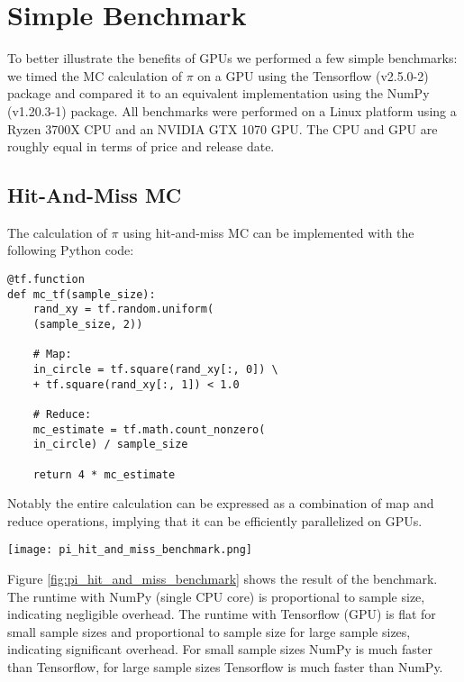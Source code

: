 \section{Simple Benchmark}
To better illustrate the benefits of GPUs we performed a few simple benchmarks:
we timed the MC calculation of $\pi$ on a GPU using the Tensorflow (v2.5.0-2) package and compared it
to an equivalent implementation using the NumPy (v1.20.3-1) package.
All benchmarks were performed on a Linux platform using a Ryzen 3700X CPU and an NVIDIA GTX 1070 GPU.
The CPU and GPU are roughly equal in terms of price and release date.
\subsection{Hit-And-Miss MC}
The calculation of $\pi$ using hit-and-miss MC can be implemented with the following Python code:
\begin{lstlisting}
@tf.function
def mc_tf(sample_size):
    rand_xy = tf.random.uniform(
	(sample_size, 2))

    # Map:
    in_circle = tf.square(rand_xy[:, 0]) \
	+ tf.square(rand_xy[:, 1]) < 1.0

    # Reduce:
    mc_estimate = tf.math.count_nonzero(
	in_circle) / sample_size

    return 4 * mc_estimate
\end{lstlisting}
Notably the entire calculation can be expressed as a combination of map and reduce operations,
implying that it can be efficiently parallelized on GPUs.
\begin{figure*}
	\centering
	\texttt{[image: pi\_hit\_and\_miss\_benchmark.png]}
	\caption{
		Benchmark of hit-and-miss MC.
		Runtime with NumPy is proportional to sample size.
		Runtime with Tensorflow is constant for $N \le 10^7$.
		Runtime with Tensorflow is proportional to sample size for $N \ge 10^9$
		(assuming Tensorflow is already initialized).
	}
	\label{fig:pi_hit_and_miss_benchmark}
\end{figure*}
Figure \ref{fig:pi_hit_and_miss_benchmark} shows the result of the benchmark.
The runtime with NumPy (single CPU core) is proportional to sample size, indicating negligible overhead.
The runtime with Tensorflow (GPU) is flat for small sample sizes and proportional to sample size for large sample sizes,
indicating significant overhead.
For small sample sizes NumPy is much faster than Tensorflow, for large sample sizes Tensorflow is much faster than NumPy.

